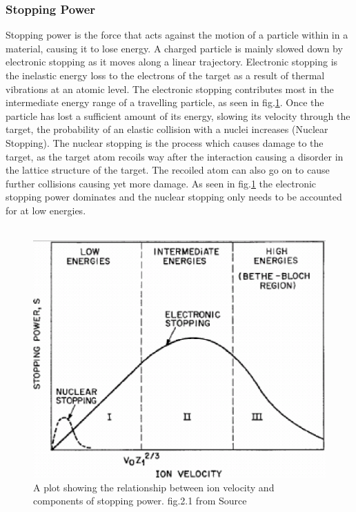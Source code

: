 \documentclass[12pt,a4paper]{article}
\begin{document}
\subsubsection{Stopping Power}
\label{stop}
Stopping power is the force that acts against the motion of a particle within in a material, causing it to lose energy. A charged particle is mainly slowed down by electronic stopping as it moves along a linear trajectory. Electronic stopping is the inelastic energy loss to the electrons of the target as a result of thermal vibrations at an atomic level. The electronic stopping contributes most in the intermediate energy range of a travelling particle, as seen in fig.\ref{stprg}. Once the particle has lost a sufficient amount of its energy, slowing its velocity through the target, the probability of an elastic collision with a nuclei increases (Nuclear Stopping). The nuclear stopping is the process which causes damage to the target, as the target atom recoils way after the interaction causing a disorder in the lattice structure of the target. The recoiled atom can also go on to cause further collisions causing yet more damage. As seen in fig.\ref{stprg} the electronic stopping power dominates and the nuclear stopping only needs to be accounted for at low energies.
\\\\
\begin{figure}[h!]
\centering
\includegraphics[scale=0.4]{Images//Stopping//stoppingrange.png}
\caption[width=\columnwidth]{A plot showing the relationship between ion velocity and components of stopping power. fig.2.1 from Source \cite{stprg}}
\label{stprg}
\end{figure}
\end{document}
